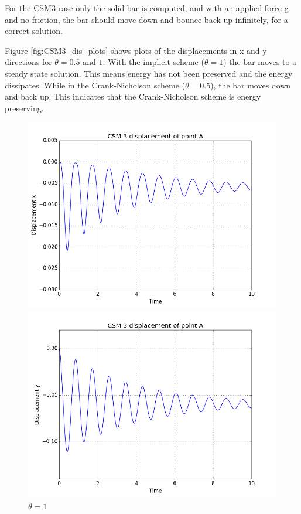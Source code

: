 For the CSM3 case only the solid bar is computed, and with an applied force g and no friction, the bar should move down and bounce back up infinitely, for a correct solution.

Figure \ref{fig:CSM3_dis_plots} shows plots of the displacements in x and y directions for $\theta = 0.5$ and $1$. With the implicit scheme ($\theta=1$) the bar moves to a steady state solution. This means energy has not been preserved and the energy dissipates. While in the Crank-Nicholson scheme ($\theta = 0.5$), the bar moves down and back up. This indicates that the Crank-Nicholson scheme is energy preserving.

\begin{figure}[H] 
  \begin{minipage}[b]{0.6\linewidth}
    \centering
    \includegraphics[scale=0.40]{./Temporal_stability/CSM3_implicit.png} 
    \caption{$\theta = 1 $} 
    \vspace{4ex}
  \end{minipage}%
  \begin{minipage}[b]{0.6\linewidth}
    \centering
    \includegraphics[scale=0.40]{./Temporal_stability/CSM3_implicit_y.png} 

\end{minipage}
\end{figure}

